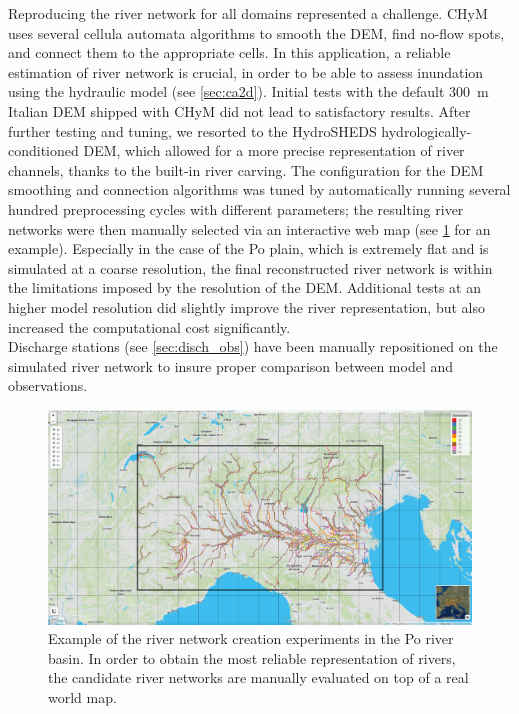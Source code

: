 Reproducing the river network for all domains represented a challenge.
CHyM uses several cellula automata algorithms to smooth the DEM, find no-flow spots, and connect them to the appropriate cells.
In this application, a reliable estimation of river network is crucial, in order to be able to assess inundation using the hydraulic model (see \cref{sec:ca2d}).
Initial tests with the default \SI{300}{\meter} Italian DEM shipped with CHyM did not lead to satisfactory results.
After further testing and tuning, we resorted to the HydroSHEDS hydrologically-conditioned DEM, which allowed for a more precise representation of river channels, thanks to the built-in river carving.
The configuration for the DEM smoothing and connection algorithms was tuned by automatically running several hundred preprocessing cycles with different parameters; the resulting river networks were then manually selected via an interactive web map (see \cref{fig:river_network} for an example).
Especially in the case of the Po plain, which is extremely flat and is simulated at a coarse resolution, the final reconstructed river network is within the limitations imposed by the resolution of the DEM.
Additional tests at an higher model resolution did slightly improve the river representation, but also increased the computational cost significantly.\\
Discharge stations (see \cref{sec:disch_obs}) have been manually repositioned on the simulated river network to insure proper comparison between model and observations.
\afterpage{\clearpage}
\begin{figure}
    \centering
    \includegraphics[width=\textheight]{figures/chym_routing_po}
    \decoRule
    \caption[Example river networks in the Po river basin]{
        Example of the river network creation experiments in the Po river basin. In order to obtain the most reliable representation of rivers, the candidate river networks are manually evaluated on top of a real world map.
    } \label{fig:river_network}
\end{figure}



